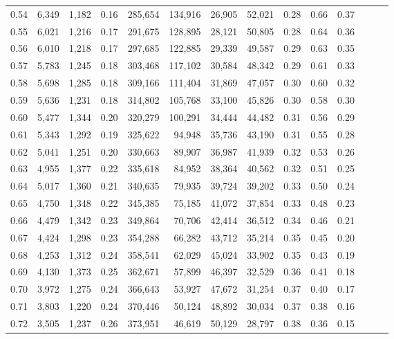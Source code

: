 \begin{tabular}{rrrrrrrrrrrrrr}
0.54 &  6,349 &  1,182 &  0.16 &  285,654 &  134,916 &  26,905 &  52,021 &  0.28 &  0.66 &      0.37 \\
0.55 &  6,021 &  1,216 &  0.17 &  291,675 &  128,895 &  28,121 &  50,805 &  0.28 &  0.64 &      0.36 \\
0.56 &  6,010 &  1,218 &  0.17 &  297,685 &  122,885 &  29,339 &  49,587 &  0.29 &  0.63 &      0.35 \\
0.57 &  5,783 &  1,245 &  0.18 &  303,468 &  117,102 &  30,584 &  48,342 &  0.29 &  0.61 &      0.33 \\
0.58 &  5,698 &  1,285 &  0.18 &  309,166 &  111,404 &  31,869 &  47,057 &  0.30 &  0.60 &      0.32 \\
0.59 &  5,636 &  1,231 &  0.18 &  314,802 &  105,768 &  33,100 &  45,826 &  0.30 &  0.58 &      0.30 \\
0.60 &  5,477 &  1,344 &  0.20 &  320,279 &  100,291 &  34,444 &  44,482 &  0.31 &  0.56 &      0.29 \\
0.61 &  5,343 &  1,292 &  0.19 &  325,622 &   94,948 &  35,736 &  43,190 &  0.31 &  0.55 &      0.28 \\
0.62 &  5,041 &  1,251 &  0.20 &  330,663 &   89,907 &  36,987 &  41,939 &  0.32 &  0.53 &      0.26 \\
0.63 &  4,955 &  1,377 &  0.22 &  335,618 &   84,952 &  38,364 &  40,562 &  0.32 &  0.51 &      0.25 \\
0.64 &  5,017 &  1,360 &  0.21 &  340,635 &   79,935 &  39,724 &  39,202 &  0.33 &  0.50 &      0.24 \\
0.65 &  4,750 &  1,348 &  0.22 &  345,385 &   75,185 &  41,072 &  37,854 &  0.33 &  0.48 &      0.23 \\
0.66 &  4,479 &  1,342 &  0.23 &  349,864 &   70,706 &  42,414 &  36,512 &  0.34 &  0.46 &      0.21 \\
0.67 &  4,424 &  1,298 &  0.23 &  354,288 &   66,282 &  43,712 &  35,214 &  0.35 &  0.45 &      0.20 \\
0.68 &  4,253 &  1,312 &  0.24 &  358,541 &   62,029 &  45,024 &  33,902 &  0.35 &  0.43 &      0.19 \\
0.69 &  4,130 &  1,373 &  0.25 &  362,671 &   57,899 &  46,397 &  32,529 &  0.36 &  0.41 &      0.18 \\
0.70 &  3,972 &  1,275 &  0.24 &  366,643 &   53,927 &  47,672 &  31,254 &  0.37 &  0.40 &      0.17 \\
0.71 &  3,803 &  1,220 &  0.24 &  370,446 &   50,124 &  48,892 &  30,034 &  0.37 &  0.38 &      0.16 \\
0.72 &  3,505 &  1,237 &  0.26 &  373,951 &   46,619 &  50,129 &  28,797 &  0.38 &  0.36 &      0.15 \\

\end{tabular}
